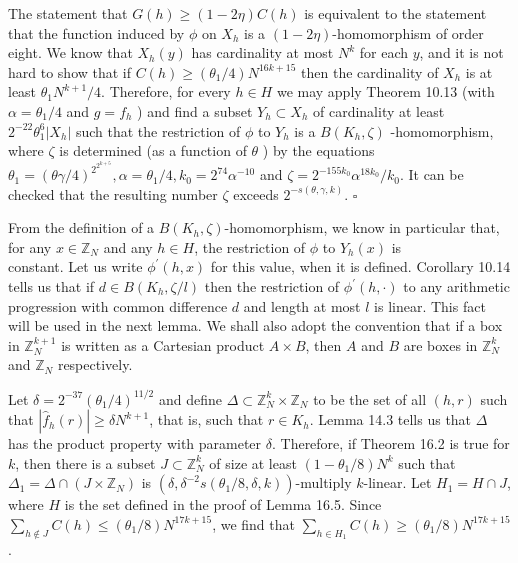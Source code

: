 \documentclass[10pt]{article}
\begin{document}
The statement that $G(h) \geqslant(1-2 \eta) C(h)$ is equivalent to the statement that the function induced by $\phi$ on $X_{h}$ is a $(1-2 \eta)$-homomorphism of order eight. We know that $X_{h}(y)$ has cardinality at most $N^{k}$ for each $y$, and it is not hard to show that if $C(h) \geqslant\left(\theta_{1} / 4\right) N^{16 k+15}$ then the cardinality of $X_{h}$ is at least $\theta_{1} N^{k+1} / 4$. Therefore, for every $h \in H$ we may apply Theorem 10.13 (with $\alpha=\theta_{1} / 4$ and $g=f_{h}$ ) and find a subset $Y_{h} \subset X_{h}$ of cardinality at least $2^{-22} \theta_{1}^{6}\left|X_{h}\right|$ such that the restriction of $\phi$ to $Y_{h}$ is a $B\left(K_{h}, \zeta\right)$ -homomorphism, where $\zeta$ is determined (as a function of $\theta$ ) by the equations $\theta_{1}=(\theta \gamma / 4)^{2^{2^{k+5}}}, \alpha=\theta_{1} / 4, k_{0}=2^{74} \alpha^{-10}$ and $\zeta=2^{-155 k_{0}} \alpha^{18 k_{0}} / k_{0}$. It can be checked that the resulting number $\zeta$ exceeds $2^{-s(\theta, \gamma, k)}$. \(\square\)

From the definition of a $B\left(K_{h}, \zeta\right)$-homomorphism, we know in particular that, for any $x \in \mathbb{Z}_{N}$ and any $h \in H$, the restriction of $\phi$ to $Y_{h}(x)$ is\\
constant. Let us write $\phi^{\prime}(h, x)$ for this value, when it is defined. Corollary 10.14 tells us that if $d \in B\left(K_{h}, \zeta / l\right)$ then the restriction of $\phi^{\prime}(h,\mathord\cdot)$ to any arithmetic progression with common difference $d$ and length at most $l$ is linear. This fact will be used in the next lemma. We shall also adopt the convention that if a box in $\mathbb{Z}_{N}^{k+1}$ is written as a Cartesian product $A \times B$, then $A$ and $B$ are boxes in $\mathbb{Z}_{N}^{k}$ and $\mathbb{Z}_{N}$ respectively.

Let $\delta=2^{-37}\left(\theta_{1} / 4\right)^{11 / 2}$ and define $\Delta \subset \mathbb{Z}_{N}^{k} \times \mathbb{Z}_{N}$ to be the set of all $(h, r)$ such that $\left|\hat{f}_{h}(r)\right| \geqslant \delta N^{k+1}$, that is, such that $r \in K_{h}$. Lemma 14.3 tells us that $\Delta$ has the product property with parameter $\delta$. Therefore, if Theorem 16.2 is true for $k$, then there is a subset $J \subset \mathbb{Z}_{N}^{k}$ of size at least $\left(1-\theta_{1} / 8\right) N^{k}$ such that $\Delta_{1}=\Delta \cap\left(J \times \mathbb{Z}_{N}\right)$ is $\left(\delta, \delta^{-2} s\left(\theta_{1} / 8, \delta, k\right)\right)$-multiply $k$-linear. Let $H_{1}=H \cap J$, where $H$ is the set defined in the proof of Lemma 16.5. Since $\sum_{h \notin J} C(h) \leqslant\left(\theta_{1} / 8\right) N^{17 k+15}$, we find that $\sum_{h \in H_{1}} C(h) \geqslant\left(\theta_{1} / 8\right) N^{17 k+15}$.
\end{document}
